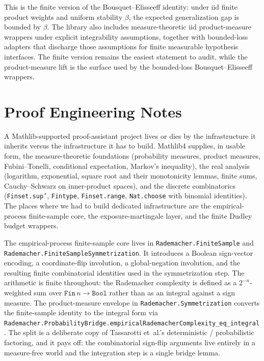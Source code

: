 \documentclass[sigplan,anonymous,review,screen]{acmart}
\begin{document}
\noindent
This is the finite version of the Bousquet--Elisseeff identity:
under iid finite product weights and uniform stability $\beta$, the
expected generalization gap is bounded by $\beta$. The library also includes
measure-theoretic iid product-measure wrappers under explicit integrability
assumptions, together with bounded-loss adapters that discharge those
assumptions for finite measurable hypothesis interfaces. The finite version
remains the easiest statement to audit, while the product-measure lift is the
surface used by the bounded-loss Bousquet--Elisseeff wrappers.

\section{Proof Engineering Notes}
\label{sec:engineering}

A Mathlib-supported proof-assistant project lives or dies by the
infrastructure it inherits versus the infrastructure it has to build.
Mathlib4 supplies, in usable form, the measure-theoretic foundations
(probability measures, product measures, Fubini--Tonelli, conditional
expectation, Markov's inequality), the real analysis (logarithm,
exponential, square root and their monotonicity lemmas, finite sums,
Cauchy--Schwarz on inner-product spaces), and the discrete combinatorics
(\texttt{Finset.sup'}, \texttt{Fintype}, \texttt{Finset.range},
\texttt{Nat.choose} with binomial identities). The places where we had
to build dedicated infrastructure are the empirical-process
finite-sample core, the exposure-martingale layer, and the
finite Dudley budget wrappers.

The empirical-process finite-sample core lives in
\texttt{Rademacher.FiniteSample} and \texttt{Rademacher.}\allowbreak\texttt{FiniteSampleSymmetrization}. It introduces a Boolean
sign-vector encoding, a coordinate-flip involution, a global-negation
involution, and the resulting finite combinatorial identities used in
the symmetrization step. The arithmetic is finite throughout: the
Rademacher complexity is defined as a $2^{-n}$-weighted sum over
$\texttt{Fin}\,n \to \texttt{Bool}$ rather than as an integral against a
sign measure. The product-measure envelope in
\texttt{Rademacher.Symmetrization} converts the finite-sample identity
to the integral form via
\texttt{Rademacher.ProbabilityBridge.}\allowbreak\texttt{empiricalRademacherComplexity\_eq\_integral}.
The split is a deliberate copy of Tassarotti et~al.'s deterministic /
probabilistic factoring, and it pays off: the combinatorial sign-flip
arguments live entirely in a measure-free world and the integration step
is a single bridge lemma.
\end{document}
